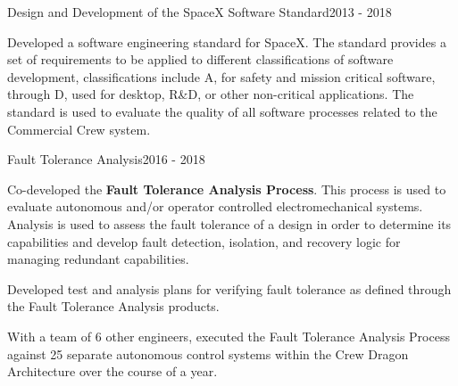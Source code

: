 \begin{cventries}

  \cventry
  {Design and Development of the SpaceX Software Standard}{}{}{2013 - 2018}
  {
    \begin{cvitems}
    \item Developed a software engineering standard for SpaceX. The
      standard provides a set of requirements to be applied to different
      classifications of software development, classifications include A,
      for safety and mission critical software, through D, used for
      desktop, R\&D, or other non-critical applications. The standard is
      used to evaluate the quality of all software processes related to the
      Commercial Crew system.
    \end{cvitems}
  }


  \cventry
  {Fault Tolerance Analysis}{}{}{2016 - 2018}
  {
    \begin{cvitems}
    \item Co-developed the \textbf{Fault Tolerance Analysis Process}. This
      process is used to evaluate autonomous and/or operator controlled
      electromechanical systems. Analysis is used to assess the fault
      tolerance of a design in order to determine its capabilities and
      develop fault detection, isolation, and recovery logic for managing
      redundant capabilities.
    \item Developed test and analysis plans for verifying fault tolerance
      as defined through the Fault Tolerance Analysis products.
    \item With a team of 6 other engineers, executed the Fault Tolerance
      Analysis Process against 25 separate autonomous control systems
      within the Crew Dragon Architecture over the course of a year.
    \end{cvitems}
  }
\end{cventries}
